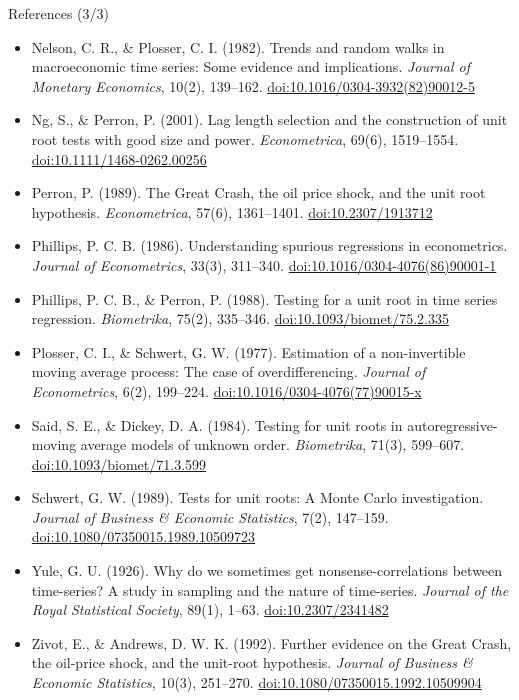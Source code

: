 \begin{frame}{References (3/3)}
\itemsize{\scriptsize}
\begin{itemize}
    \item Nelson, C. R., \& Plosser, C. I. (1982). Trends and random walks in macroeconomic time series: Some evidence and implications. \textit{Journal of Monetary Economics}, 10(2), 139--162. \href{https://doi.org/10.1016/0304-3932(82)90012-5}{doi:10.1016/0304-3932(82)90012-5}
    \item Ng, S., \& Perron, P. (2001). Lag length selection and the construction of unit root tests with good size and power. \textit{Econometrica}, 69(6), 1519--1554. \href{https://doi.org/10.1111/1468-0262.00256}{doi:10.1111/1468-0262.00256}
    \item Perron, P. (1989). The Great Crash, the oil price shock, and the unit root hypothesis. \textit{Econometrica}, 57(6), 1361--1401. \href{https://doi.org/10.2307/1913712}{doi:10.2307/1913712}
    \item Phillips, P. C. B. (1986). Understanding spurious regressions in econometrics. \textit{Journal of Econometrics}, 33(3), 311--340. \href{https://doi.org/10.1016/0304-4076(86)90001-1}{doi:10.1016/0304-4076(86)90001-1}
    \item Phillips, P. C. B., \& Perron, P. (1988). Testing for a unit root in time series regression. \textit{Biometrika}, 75(2), 335--346. \href{https://doi.org/10.1093/biomet/75.2.335}{doi:10.1093/biomet/75.2.335}
    \item Plosser, C. I., \& Schwert, G. W. (1977). Estimation of a non-invertible moving average process: The case of overdifferencing. \textit{Journal of Econometrics}, 6(2), 199--224. \href{https://doi.org/10.1016/0304-4076(77)90015-x}{doi:10.1016/0304-4076(77)90015-x}
    \item Said, S. E., \& Dickey, D. A. (1984). Testing for unit roots in autoregressive-moving average models of unknown order. \textit{Biometrika}, 71(3), 599--607. \href{https://doi.org/10.1093/biomet/71.3.599}{doi:10.1093/biomet/71.3.599}
    \item Schwert, G. W. (1989). Tests for unit roots: A Monte Carlo investigation. \textit{Journal of Business \& Economic Statistics}, 7(2), 147--159. \href{https://doi.org/10.1080/07350015.1989.10509723}{doi:10.1080/07350015.1989.10509723}
    \item Yule, G. U. (1926). Why do we sometimes get nonsense-correlations between time-series? A study in sampling and the nature of time-series. \textit{Journal of the Royal Statistical Society}, 89(1), 1--63. \href{https://doi.org/10.2307/2341482}{doi:10.2307/2341482}
    \item Zivot, E., \& Andrews, D. W. K. (1992). Further evidence on the Great Crash, the oil-price shock, and the unit-root hypothesis. \textit{Journal of Business \& Economic Statistics}, 10(3), 251--270. \href{https://doi.org/10.1080/07350015.1992.10509904}{doi:10.1080/07350015.1992.10509904}
\end{itemize}
\end{frame}


